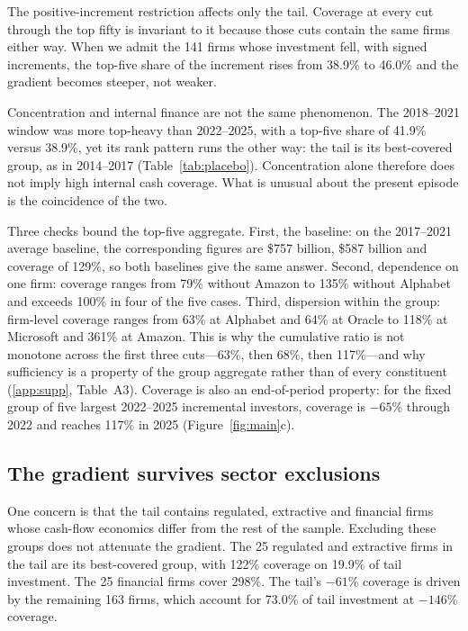 \documentclass[preprint,11pt]{elsarticle}
\begin{document}
The positive-increment restriction affects only the tail. Coverage at every cut through the top
fifty is invariant to it because those cuts contain the same firms either way. When we admit the 141
firms whose investment fell, with signed increments, the top-five share of the increment rises from
38.9\% to 46.0\% and the gradient becomes steeper, not weaker.

Concentration and internal finance are not the same phenomenon. The 2018--2021 window was more
top-heavy than 2022--2025, with a top-five share of 41.9\% versus 38.9\%, yet its rank pattern runs
the other way: the tail is its best-covered group, as in 2014--2017 (Table~\ref{tab:placebo}).
Concentration alone therefore does not imply high internal cash coverage. What is unusual about the
present episode is the coincidence of the two.

Three checks bound the top-five aggregate. First, the baseline: on the 2017--2021 average baseline,
the corresponding figures are \$757 billion, \$587 billion and coverage of 129\%, so both baselines
give the same answer. Second, dependence on one firm: coverage ranges from 79\% without Amazon to
135\% without Alphabet and exceeds 100\% in four of the five cases. Third, dispersion within the
group: firm-level coverage ranges from 63\% at Alphabet and 64\% at Oracle to 118\% at Microsoft and
361\% at Amazon. This is why the cumulative ratio is not monotone across the first three
cuts---63\%, then 68\%, then 117\%---and why sufficiency is a property of the group aggregate rather
than of every constituent (\ref{app:supp}, Table~A3). Coverage is also an end-of-period property:
for the fixed group of five largest 2022--2025 incremental investors, coverage is $-65$\% through
2022 and reaches 117\% in 2025 (Figure~\ref{fig:main}c).

\subsection{The gradient survives sector exclusions}\label{sec:comp}
One concern is that the tail contains regulated, extractive and financial firms whose cash-flow
economics differ from the rest of the sample. Excluding these groups does not attenuate the
gradient. The 25 regulated and extractive firms in the tail are its best-covered group, with 122\%
coverage on 19.9\% of tail investment. The 25 financial firms cover 298\%. The tail's $-61$\%
coverage is driven by the remaining 163 firms, which account for 73.0\% of tail investment at
$-146$\% coverage.
\end{document}
